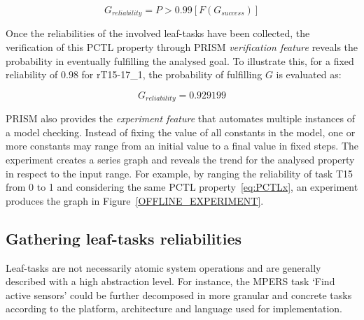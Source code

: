 \begin{equation}\label{eq:PCTLx}
G_{reliability}=P > 0.99 [ F (G_{success})]
\end{equation}

Once the reliabilities of the involved leaf-tasks have been collected, the verification of this PCTL property through PRISM \textit{verification feature} reveals the probability in eventually fulfilling the analysed goal. To illustrate this, for a fixed reliability of $0.98$ for rT15-17\_1, the probability of fulfilling $G$ is evaluated as:

$$G_{reliability}=0.929199$$ 

PRISM also provides the \textit{experiment feature} that automates multiple instances of a model checking. Instead of fixing the value of all constants in the model, one or more constants may range from an initial value to a final value in fixed steps. The experiment creates a series graph and reveals the trend for the analysed property in respect to the input range. For example, by ranging the reliability of task T15 from 0 to 1 and considering the same PCTL property~\eqref{eq:PCTLx}, an experiment produces the graph in Figure~\ref{OFFLINE_EXPERIMENT}.



\subsection{Gathering leaf-tasks reliabilities}

Leaf-tasks are not necessarily atomic system operations and are generally described with a high abstraction level. For instance, the MPERS task `Find active sensors' could be further decomposed in more granular and concrete tasks according to the platform, architecture and language used for implementation. 



